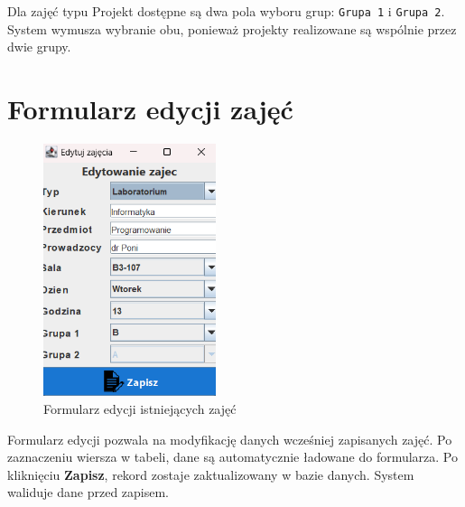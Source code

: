 Dla zajęć typu Projekt dostępne są dwa pola wyboru grup: \texttt{Grupa 1} i \texttt{Grupa 2}. System wymusza wybranie obu, ponieważ projekty realizowane są wspólnie przez dwie grupy.

\section*{Formularz edycji zajęć}
\begin{figure}[H]
\centering
\includegraphics[width=0.45\textwidth]{figures/workApl/edit_panel.png}
\caption{Formularz edycji istniejących zajęć}
\label{fig:edit_panel}
\end{figure}

Formularz edycji pozwala na modyfikację danych wcześniej zapisanych zajęć. Po zaznaczeniu wiersza w tabeli, dane są automatycznie ładowane do formularza. Po kliknięciu \textbf{Zapisz}, rekord zostaje zaktualizowany w bazie danych. System waliduje dane przed zapisem.
